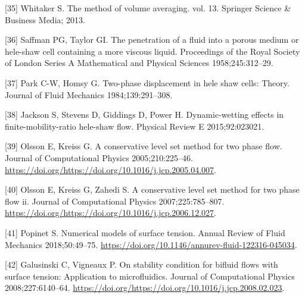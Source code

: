 \documentclass[]{article}
\begin{document}
\leavevmode\hypertarget{ref-Whitaker2013}{}%
{[}35{]} Whitaker S. The method of volume averaging. vol. 13. Springer
Science \& Business Media; 2013.

\leavevmode\hypertarget{ref-saffman1958penetration}{}%
{[}36{]} Saffman PG, Taylor GI. The penetration of a fluid into a porous
medium or hele-shaw cell containing a more viscous liquid. Proceedings
of the Royal Society of London Series A Mathematical and Physical
Sciences 1958;245:312--29.

\leavevmode\hypertarget{ref-park1984two}{}%
{[}37{]} Park C-W, Homsy G. Two-phase displacement in hele shaw cells:
Theory. Journal of Fluid Mechanics 1984;139:291--308.

\leavevmode\hypertarget{ref-jackson2015dynamic}{}%
{[}38{]} Jackson S, Stevens D, Giddings D, Power H. Dynamic-wetting
effects in finite-mobility-ratio hele-shaw flow. Physical Review E
2015;92:023021.

\leavevmode\hypertarget{ref-Olsson2005}{}%
{[}39{]} Olsson E, Kreiss G. A conservative level set method for two
phase flow. Journal of Computational Physics 2005;210:225--46.
\url{https://doi.org/https://doi.org/10.1016/j.jcp.2005.04.007}.

\leavevmode\hypertarget{ref-Olsson2007}{}%
{[}40{]} Olsson E, Kreiss G, Zahedi S. A conservative level set method
for two phase flow ii. Journal of Computational Physics
2007;225:785--807.
\url{https://doi.org/https://doi.org/10.1016/j.jcp.2006.12.027}.

\leavevmode\hypertarget{ref-Popinet2018}{}%
{[}41{]} Popinet S. Numerical models of surface tension. Annual Review
of Fluid Mechanics 2018;50:49--75.
\url{https://doi.org/10.1146/annurev-fluid-122316-045034}.

\leavevmode\hypertarget{ref-Galusinski2008}{}%
{[}42{]} Galusinski C, Vigneaux P. On stability condition for bifluid
flows with surface tension: Application to microfluidics. Journal of
Computational Physics 2008;227:6140--64.
\url{https://doi.org/https://doi.org/10.1016/j.jcp.2008.02.023}.
\end{document}
